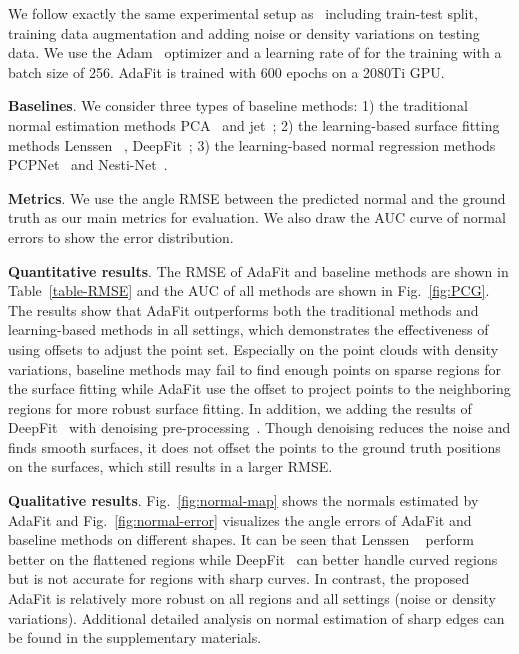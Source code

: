 We follow exactly the same experimental setup as~\cite{guerrero2018pcpnet} including train-test split, training data augmentation and adding noise or density variations on testing data. 
We use the Adam~\cite{kingma2015adam} optimizer and a learning rate of  for the training with a batch size of 256. AdaFit is trained with 600 epochs on a 2080Ti GPU.

\textbf{Baselines}. We consider three types of baseline methods: 1) the traditional normal estimation methods PCA~\cite{hoppe1992surface} and jet~\cite{cazals2005estimating}; 2) the learning-based surface fitting methods Lenssen \etal~\cite{lenssen2020deep}, DeepFit~\cite{ben2020deepfit}; 3) the learning-based normal regression methods PCPNet~\cite{guerrero2018pcpnet} and Nesti-Net~\cite{ben2019nesti}.

\textbf{Metrics}. We use the angle RMSE between the predicted normal and the ground truth as our main metrics for evaluation. We also draw the AUC curve of normal errors to show the error distribution.

\textbf{Quantitative results}. The RMSE of AdaFit and baseline methods are shown in Table~\ref{table-RMSE} and the AUC of all methods are shown in Fig.~\ref{fig:PCG}. The results show that AdaFit outperforms both the traditional methods and learning-based methods in all settings, which demonstrates the effectiveness of using offsets to adjust the point set. Especially on the point clouds with density variations, baseline methods may fail to find enough points on sparse regions for the surface fitting while AdaFit use the offset to project points to the neighboring regions for more robust surface fitting. In addition, we adding the results of DeepFit~\cite{ben2020deepfit} with denoising pre-processing~\cite{rakotosaona2020pointcleannet}. Though denoising reduces the noise and finds smooth surfaces, it does not offset the points to the ground truth positions on the surfaces, which still results in a larger RMSE.


\textbf{Qualitative results}. Fig.~\ref{fig:normal-map} shows the normals estimated by AdaFit and Fig.~\ref{fig:normal-error} visualizes the angle errors of AdaFit and baseline methods on different shapes. It can be seen that Lenssen \etal~\cite{lenssen2020deep} perform better on the flattened regions while DeepFit~\cite{ben2020deepfit} can better handle curved regions but is not accurate for regions with sharp curves. In contrast, the proposed AdaFit is relatively more robust on all regions and all settings (noise or density variations). Additional detailed analysis on normal estimation of sharp edges can be found in the supplementary materials.

